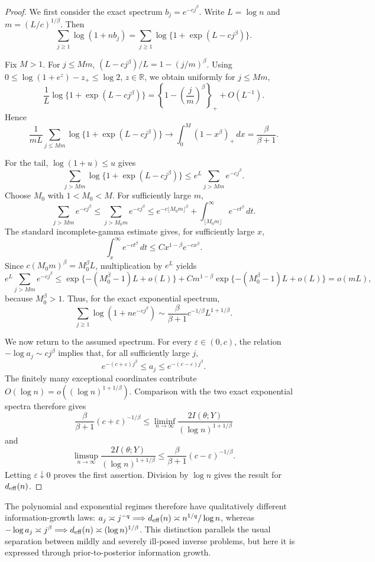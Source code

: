 \documentclass[11pt]{article}
\theoremstyle{plain}
\theoremstyle{definition}
\theoremstyle{remark}
\begin{document}
\begin{proof}
	We first consider the exact spectrum \(b_j=e^{-cj^\beta}\). Write \(L=\log n\) and \(m=(L/c)^{1/\beta}\). Then
	\[
	\sum_{j\geq1}\log(1+nb_j)
	=
	\sum_{j\geq1}\log\{1+\exp(L-cj^\beta)\}.
	\]
	
	Fix \(M>1\). For \(j\leq Mm\), \((L-cj^\beta)/L=1-(j/m)^\beta\). Using \(0\leq\log(1+e^z)-z_+\leq\log2\), \(z\in\mathbb R\), we obtain uniformly for \(j\leq Mm\),
	\[
	\frac{1}{L}\log\{1+\exp(L-cj^\beta)\}
	=
	\left\{1-\left(\frac{j}{m}\right)^\beta\right\}_+
	+
	O(L^{-1}).
	\]
	Hence
	\[
	\frac{1}{mL}
	\sum_{j\leq Mm}\log\{1+\exp(L-cj^\beta)\}
	\longrightarrow
	\int_0^M(1-x^\beta)_+\,dx
	=
	\frac{\beta}{\beta+1}.
	\]
	
	For the tail, \(\log(1+u)\leq u\) gives
	\[
	\sum_{j>Mm}\log\{1+\exp(L-cj^\beta)\}
	\leq
	e^L\sum_{j>Mm}e^{-cj^\beta}.
	\]
	Choose \(M_0\) with \(1<M_0<M\). For sufficiently large \(m\),
	\[
	\sum_{j>Mm}e^{-cj^\beta}
	\leq
	\sum_{j>M_0m}e^{-cj^\beta}
	\leq
	e^{-c\lfloor M_0m\rfloor^\beta}
	+
	\int_{\lfloor M_0m\rfloor}^{\infty}e^{-ct^\beta}\,dt.
	\]
	The standard incomplete-gamma estimate gives, for sufficiently large \(x\),
	\[
	\int_x^\infty e^{-ct^\beta}\,dt
	\leq
	C x^{1-\beta}e^{-cx^\beta}.
	\]
	Since \(c(M_0m)^\beta=M_0^\beta L\), multiplication by \(e^L\) yields
	\[
	e^L\sum_{j>Mm}e^{-cj^\beta}
	\leq
	\exp\{-(M_0^\beta-1)L+o(L)\}
	+
	C m^{1-\beta}
	\exp\{-(M_0^\beta-1)L+o(L)\}
	=
	o(mL),
	\]
	because \(M_0^\beta>1\). Thus, for the exact exponential spectrum,
	\[
	\sum_{j\geq1}\log(1+ne^{-cj^\beta})
	\sim
	\frac{\beta}{\beta+1}c^{-1/\beta}L^{1+1/\beta}.
	\]
	
	We now return to the assumed spectrum. For every \(\varepsilon\in(0,c)\), the relation \(-\log a_j\sim cj^\beta\) implies that, for all sufficiently large \(j\),
	\[
	e^{-(c+\varepsilon)j^\beta}
	\leq
	a_j
	\leq
	e^{-(c-\varepsilon)j^\beta}.
	\]
	The finitely many exceptional coordinates contribute \(O(\log n)=o\!\left((\log n)^{1+1/\beta}\right)\). Comparison with the two exact exponential spectra therefore gives
	\[
	\frac{\beta}{\beta+1}(c+\varepsilon)^{-1/\beta}
	\leq
	\liminf_{n\to\infty}
	\frac{2I(\theta;Y)}{(\log n)^{1+1/\beta}}
	\]
	and
	\[
	\limsup_{n\to\infty}
	\frac{2I(\theta;Y)}{(\log n)^{1+1/\beta}}
	\leq
	\frac{\beta}{\beta+1}(c-\varepsilon)^{-1/\beta}.
	\]
	Letting \(\varepsilon\downarrow0\) proves the first assertion. Division by \(\log n\) gives the result for \(d_{\rm eff}(n)\).
\end{proof}

The polynomial and exponential regimes therefore have qualitatively different information-growth laws: \(a_j\asymp j^{-q}\Longrightarrow d_{\rm eff}(n)\asymp n^{1/q}/\log n\), whereas \(-\log a_j\asymp j^\beta\Longrightarrow d_{\rm eff}(n)\asymp(\log n)^{1/\beta}\). This distinction parallels the usual separation between mildly and severely ill-posed inverse problems, but here it is expressed through prior-to-posterior information growth.
\end{document}
